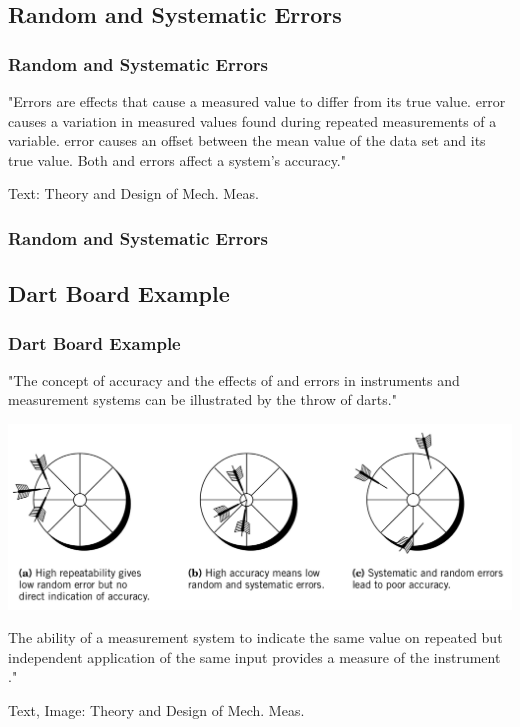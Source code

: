 \documentclass[fleqn]{beamer} %
\newcommand{\sectionIIsubsectionItitle}{Random and Systematic Errors}
\newcommand{\sectionIIsubsectionIItitle}{Dart Board Example}
\begin{document}
		\subsection{\sectionIIsubsectionItitle}\label{sectionIIsubsectionI}

			\begin{frame}[label=sectionIIsubsectionI]
				\frametitle{\sectionIIsubsectionItitle}

				"Errors are effects that cause a  measured value to differ from its true value. \hspcu error causes a
				\hspcu variation in measured values found during repeated measurements of a variable. \vspc
				\hspcu error causes an offset between the mean value of the data set and its true value. Both \hspcu and
				\hspcu errors affect a system's accuracy."

				\vspace{10mm}
				{\tiny Text: Theory and Design of Mech. Meas.}

			\end{frame}

		    \begin{frame}[label=sectionIIsubsectionI]
				\frametitle{\sectionIIsubsectionItitle}





			\end{frame}	

		\subsection{\sectionIIsubsectionIItitle}\label{sectionIIsubsectionII}

			\begin{frame}
				\frametitle{\sectionIIsubsectionIItitle}
				"The concept of accuracy and the effects of \hspcu and \hspcu errors in instruments
				and measurement systems can be illustrated by the throw of darts."

				\includegraphics[scale=.20]{images/dart_throw.png}

				The ability of a measurement system to indicate the same value on repeated but independent
				application of the same input provides a measure of the instrument \hspcu."

				{\tiny Text, Image: Theory and Design of Mech. Meas.}

			\end{frame}
\end{document}
